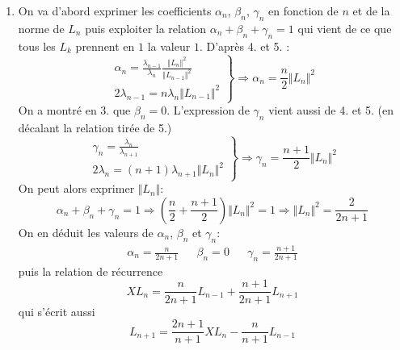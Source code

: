 \begin{enumerate}
 \item  On va d'abord exprimer les coefficients $\alpha_n$, $\beta_n$, $\gamma_n$ en fonction de $n$ et de la norme de $L_n$ puis exploiter la relation $\alpha_n+\beta_n+\gamma_n=1$ qui vient de ce que tous les $L_k$ prennent en $1$ la valeur $1$.\newline
D'après 4. et 5. :
\begin{displaymath}
 \left. 
\begin{aligned}
 \alpha_n = \frac{\lambda_{n-1}}{\lambda_n}\frac{\Vert L_n\Vert^2}{\Vert L_{n-1}\Vert^2}\\
 2\lambda_{n-1}=n\lambda_n\Vert L_{n-1}\Vert^2
\end{aligned}
\right\rbrace 
\Rightarrow
\alpha_n = \frac{n}{2}\Vert L_n \Vert^2
\end{displaymath}
On a montré en 3. que $\beta_n=0$. L'expression de $\gamma_n$ vient aussi de 4. et 5. (en décalant la relation tirée de 5.)
\begin{displaymath}
 \left. 
\begin{aligned}
 \gamma_n = \frac{\lambda_{n}}{\lambda_{n+1}}\\
 2\lambda_{n}=(n+1)\lambda_{n+1}\Vert L_{n}\Vert^2
\end{aligned}
\right\rbrace 
\Rightarrow
\gamma_n = \frac{n+1}{2}\Vert L_n \Vert^2
\end{displaymath}
On peut alors exprimer $\Vert L_n\Vert$:
\begin{displaymath}
\alpha_n+\beta_n+\gamma_n=1 \Rightarrow
\left(\frac{n}{2}+\frac{n+1}{2} \right)\Vert L_n\Vert^2=1 \Rightarrow
  \Vert L_n\Vert^2=\frac{2}{2n+1}
\end{displaymath}
On en déduit les valeurs de $\alpha_n$, $\beta_n$ et $\gamma_n$:
\begin{align*}
 \alpha_n=\frac{n}{2n+1}& &\beta_n=0 & & \gamma_n=\frac{n+1}{2n+1}
\end{align*}
puis la relation de récurrence
\begin{displaymath}
 XL_n=\frac{n}{2n+1}L_{n-1}+\frac{n+1}{2n+1}L_{n+1}
\end{displaymath}
qui s'écrit aussi
\begin{displaymath}
 L_{n+1}=\frac{2n+1}{n+1}XL_n-\frac{n}{n+1}L_{n-1}
\end{displaymath}

\end{enumerate}
